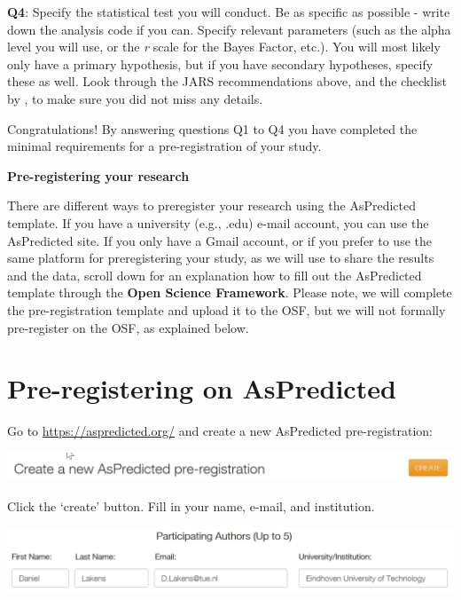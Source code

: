 \documentclass[
  oneside]{book}
\begin{document}
\textbf{Q4}: Specify the statistical test you will conduct. Be as specific as possible - write down the analysis code if you can. Specify relevant parameters (such as the alpha level you will use, or the \emph{r} scale for the Bayes Factor, etc.). You will most likely only have a primary hypothesis, but if you have secondary hypotheses, specify these as well. Look through the JARS recommendations above, and the checklist by \citet{wicherts_degrees_2016}, to make sure you did not miss any details.

Congratulations! By answering questions Q1 to Q4 you have completed the minimal requirements for a pre-registration of your study.

\textbf{Pre-registering your research}

There are different ways to preregister your research using the AsPredicted template. If you have a university (e.g., .edu) e-mail account, you can use the AsPredicted site. If you only have a Gmail account, or if you prefer to use the same platform for preregistering your study, as we will use to share the results and the data, scroll down for an explanation how to fill out the AsPredicted template through the \textbf{Open Science Framework}. Please note, we will complete the pre-registration template and upload it to the OSF, but we will not
formally pre-register on the OSF, as explained below.

\hypertarget{pre-registering-on-aspredicted}{%
\section{Pre-registering on AsPredicted}\label{pre-registering-on-aspredicted}}

Go to \url{https://aspredicted.org/} and create a new AsPredicted pre-registration:

\begin{center}\includegraphics[width=1\linewidth]{images/9fafdf4597839aeb44b3882aace1133e} \end{center}

Click the `create' button. Fill in your name, e-mail, and institution.

\begin{center}\includegraphics[width=1\linewidth]{images/1308ce9af6a5ebe700b8ff58542bdab2} \end{center}
\end{document}
